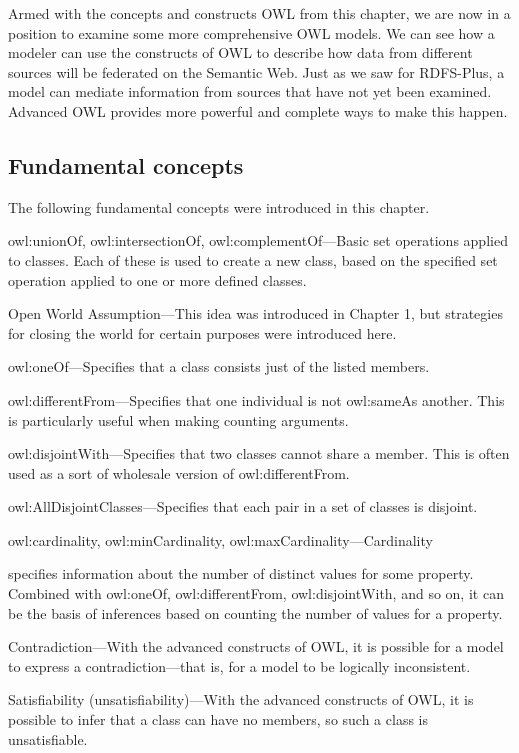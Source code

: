 Armed with the concepts and constructs OWL from this chapter, we are now
in a position to examine some more comprehensive OWL models. We can see
how a modeler can use the constructs of OWL to describe how data from
different sources will be federated on the Semantic Web. Just as we saw
for RDFS-Plus, a model can mediate information from sources that have
not yet been examined. Advanced OWL provides more powerful and complete
ways to make this happen.

\subsection{Fundamental concepts}

The following fundamental concepts were introduced in this chapter.

owl:unionOf, owl:intersectionOf, owl:complementOf---Basic set operations
applied to classes. Each of these is used to create a new class, based
on the specified set operation applied to one or more defined classes.

Open World Assumption---This idea was introduced in Chapter 1, but
strategies for closing the world for certain purposes were introduced
here.

owl:oneOf---Specifies that a class consists just of the listed members.

owl:differentFrom---Specifies that one individual is not owl:sameAs
another. This is particularly useful when making counting arguments.

owl:disjointWith---Specifies that two classes cannot share a member.
This is often used as a sort of wholesale version of owl:differentFrom.

owl:AllDisjointClasses---Specifies that each pair in a set of classes is disjoint. 

owl:cardinality, owl:minCardinality, owl:maxCardinality---Cardinality

specifies information about the number of distinct values for some
property. Combined with owl:oneOf, owl:differentFrom, owl:disjointWith,
and so on, it can be the basis of inferences based on counting the
number of values for a property.

Contradiction---With the advanced constructs of OWL, it is possible for
a model to express a contradiction---that is, for a model to be
logically inconsistent.

Satisfiability (unsatisfiability)---With the advanced constructs of OWL,
it is possible to infer that a class can have no members, so such a
class is unsatisfiable.
